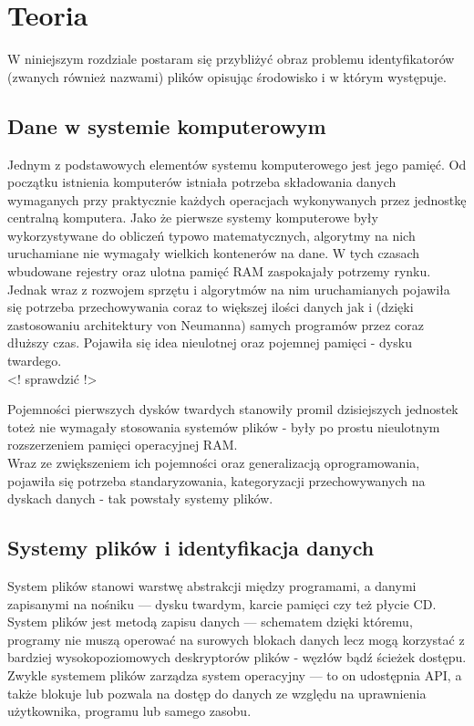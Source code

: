 \chapter{Teoria}
\label{teoria}
\par
W niniejszym rozdziale postaram się przybliżyć obraz problemu identyfikatorów (zwanych również nazwami) plików opisując środowisko i w którym występuje.

\section{Dane w systemie komputerowym}
\par
Jednym z podstawowych elementów systemu komputerowego jest jego pamięć. Od początku istnienia komputerów istniała potrzeba składowania danych wymaganych przy praktycznie każdych operacjach wykonywanych przez jednostkę centralną komputera. Jako że pierwsze systemy komputerowe były wykorzystywane do obliczeń typowo matematycznych, algorytmy na nich uruchamiane nie wymagały wielkich kontenerów na dane. W tych czasach wbudowane rejestry oraz ulotna pamięć RAM zaspokajały potrzemy rynku. Jednak wraz z rozwojem sprzętu i algorytmów na nim uruchamianych pojawiła się potrzeba przechowywania coraz to większej ilości danych jak i (dzięki zastosowaniu architektury von Neumanna) samych programów przez coraz dłuższy czas. Pojawiła się idea nieulotnej oraz pojemnej pamięci - dysku twardego.\\
<! sprawdzić !>

\par
Pojemności pierwszych dysków twardych stanowiły promil dzisiejszych jednostek toteż nie wymagały stosowania systemów plików - były po prostu nieulotnym rozszerzeniem pamięci operacyjnej RAM.\\
Wraz ze zwiększeniem ich pojemności oraz generalizacją oprogramowania, pojawiła się potrzeba standaryzowania, kategoryzacji przechowywanych na dyskach danych - tak powstały systemy plików.

\section{Systemy plików i identyfikacja danych}
\par
System plików stanowi warstwę abstrakcji między programami, a danymi zapisanymi na nośniku --- dysku twardym, karcie pamięci czy też płycie CD. System plików jest metodą zapisu danych --- schematem dzięki któremu, programy nie muszą operować na surowych blokach danych lecz mogą korzystać z bardziej wysokopoziomowych deskryptorów plików - węzłów bądź ścieżek dostępu.\\
Zwykle systemem plików zarządza system operacyjny --- to on udostępnia API, a także blokuje lub pozwala na dostęp do danych ze względu na uprawnienia użytkownika, programu lub samego zasobu.\\

